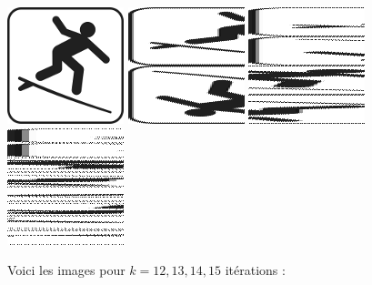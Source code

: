 \documentclass[11pt,class=report,crop=false]{standalone}
\begin{document}
\begin{cours}
\begin{center}
\includegraphics[scale=0.65]{images_fiche/surf_gimp_new_boul_0.png}\qquad
\includegraphics[scale=0.65]{images_fiche/surf_gimp_new_boul_1.png}\qquad
\includegraphics[scale=0.65]{images_fiche/surf_gimp_new_boul_2.png}\qquad
\includegraphics[scale=0.65]{images_fiche/surf_gimp_new_boul_3.png}
\end{center}


Voici les images pour $k=12,13,14,15$ itérations :


\end{cours}
\end{document}
